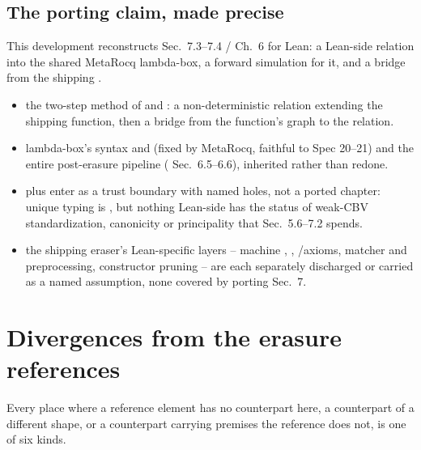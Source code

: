 \subsection*{The porting claim, made precise}
This development reconstructs  Sec.\ 7.3--7.4 /  Ch.\ 6 for Lean: a Lean-side
\Erases{} relation into the shared MetaRocq lambda-box, a forward simulation for it, and a bridge
from the shipping .

\begin{itemize}
\item {} the two-step method of  and : a non-deterministic relation
extending the shipping function, then a bridge from the function's graph to the relation.
\item {} lambda-box's syntax and \WcbvEval{} (fixed by MetaRocq, faithful
to  Spec 20--21) and the entire post-erasure pipeline ( Sec.\ 6.5--6.6),
inherited rather than redone.
\item {}  plus  enter as a trust
boundary with named holes, not a ported chapter: unique typing is  , but
nothing Lean-side has the status of weak-CBV standardization, canonicity or principality that
 Sec.\ 5.6--7.2 spends.
\item {} the shipping eraser's Lean-specific layers --
machine , , /axioms, matcher and 
preprocessing, constructor pruning -- are each separately discharged or carried as a named
assumption, none covered by porting  Sec.\ 7.
\end{itemize}

\section{Divergences from the erasure references}
\label{sec:references:divergences}

Every place where a reference element has no counterpart here, a counterpart of a different
shape, or a counterpart carrying premises the reference does not, is one of six kinds.

